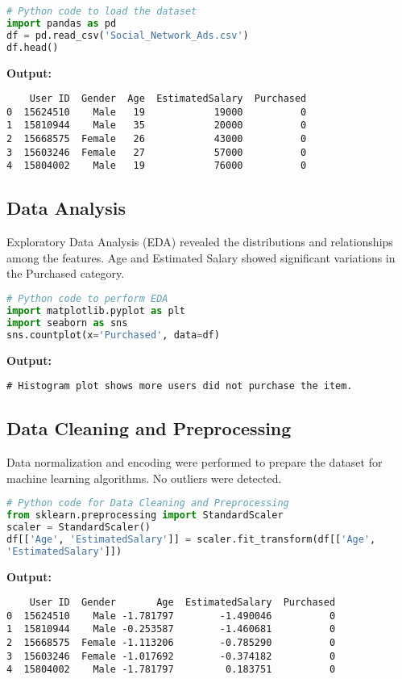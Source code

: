 \documentclass[12pt]{article}
\begin{document}
\begin{lstlisting}[language=Python]
# Python code to load the dataset
import pandas as pd
df = pd.read_csv('Social_Network_Ads.csv')
df.head()
\end{lstlisting}

\textbf{Output:}
\begin{verbatim}
    User ID  Gender  Age  EstimatedSalary  Purchased
0  15624510    Male   19            19000          0
1  15810944    Male   35            20000          0
2  15668575  Female   26            43000          0
3  15603246  Female   27            57000          0
4  15804002    Male   19            76000          0
\end{verbatim}

\subsection{Data Analysis}
Exploratory Data Analysis (EDA) revealed the distributions and relationships among the features. Age and Estimated Salary showed significant variations in the Purchased category.

\begin{lstlisting}[language=Python]
# Python code to perform EDA
import matplotlib.pyplot as plt
import seaborn as sns
sns.countplot(x='Purchased', data=df)
\end{lstlisting}

\textbf{Output:}
\begin{verbatim}
# Histogram plot shows more users did not purchase the item.
\end{verbatim}

\subsection{Data Cleaning and Preprocessing}
Data normalization and encoding were performed to prepare the dataset for machine learning algorithms. No outliers were detected.

\begin{lstlisting}[language=Python]
# Python code for Data Cleaning and Preprocessing
from sklearn.preprocessing import StandardScaler
scaler = StandardScaler()
df[['Age', 'EstimatedSalary']] = scaler.fit_transform(df[['Age', 
'EstimatedSalary']])
\end{lstlisting}
\newpage
\textbf{Output:}
\begin{verbatim}
    User ID  Gender       Age  EstimatedSalary  Purchased
0  15624510    Male -1.781797        -1.490046          0
1  15810944    Male -0.253587        -1.460681          0
2  15668575  Female -1.113206        -0.785290          0
3  15603246  Female -1.017692        -0.374182          0
4  15804002    Male -1.781797         0.183751          0
\end{verbatim}
\end{document}
